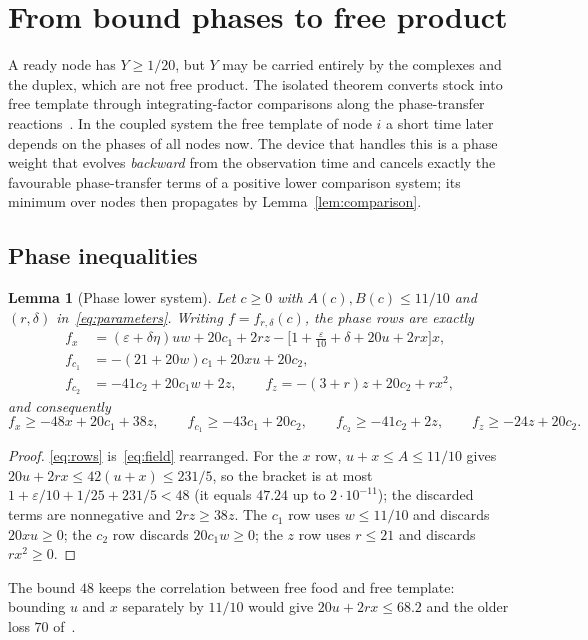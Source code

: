\documentclass[11pt,a4paper]{article}
\theoremstyle{plain}
\newtheorem{lemma}[theorem]{Lemma}
\theoremstyle{definition}
\theoremstyle{remark}
\newcommand{\eps}{\varepsilon}
\begin{document}
\section{From bound phases to free product}\label{sec:phase}

A ready node has $Y\ge1/20$, but $Y$ may be carried entirely by the complexes and the duplex, which are not free product. The isolated theorem converts stock into free template through integrating-factor comparisons along the phase-transfer reactions~\citep[Proposition~6.2]{recovery2026}. In the coupled system the free template of node $i$ a short time later depends on the phases of all nodes now. The device that handles this is a phase weight that evolves \emph{backward} from the observation time and cancels exactly the favourable phase-transfer terms of a positive lower comparison system; its minimum over nodes then propagates by Lemma~\ref{lem:comparison}.

\subsection{Phase inequalities}
\begin{lemma}[Phase lower system]\label{lem:phases}
Let $c\ge0$ with $A(c),B(c)\le11/10$ and $(r,\delta)$ in~\eqref{eq:parameters}. Writing $f=f_{r,\delta}(c)$, the phase rows are exactly
\begin{equation}\label{eq:rows}
\begin{aligned}
f_x&=(\eps+\delta\eta)uw+20c_1+2rz-\bigl[1+\tfrac{\eps}{10}+\delta+20u+2rx\bigr]x,\\
f_{c_1}&=-(21+20w)c_1+20xu+20c_2,\\
f_{c_2}&=-41c_2+20c_1w+2z,\qquad
f_z=-(3+r)z+20c_2+rx^2,
\end{aligned}
\end{equation}
and consequently
\begin{equation}\label{eq:phases}
f_x\ge-48x+20c_1+38z,\qquad f_{c_1}\ge-43c_1+20c_2,\qquad f_{c_2}\ge-41c_2+2z,\qquad f_z\ge-24z+20c_2 .
\end{equation}
\end{lemma}
\begin{proof}
\eqref{eq:rows} is~\eqref{eq:field} rearranged. For the $x$ row, $u+x\le A\le11/10$ gives $20u+2rx\le42(u+x)\le231/5$, so the bracket is at most $1+\eps/10+1/25+231/5<48$ (it equals $47.24$ up to $2\cdot10^{-11}$); the discarded terms are nonnegative and $2rz\ge38z$. The $c_1$ row uses $w\le11/10$ and discards $20xu\ge0$; the $c_2$ row discards $20c_1w\ge0$; the $z$ row uses $r\le21$ and discards $rx^2\ge0$.
\end{proof}
The bound $48$ keeps the correlation between free food and free template: bounding $u$ and $x$ separately by $11/10$ would give $20u+2rx\le68.2$ and the older loss $70$ of~\citep{recovery2026}.
\end{document}

